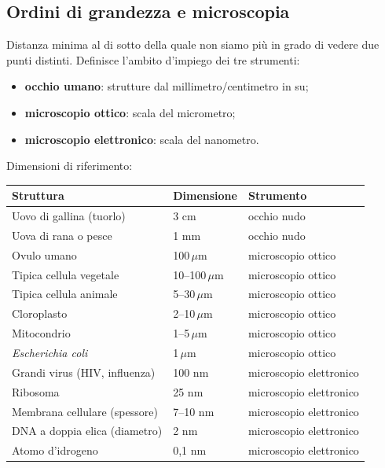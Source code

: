 \subsection{Ordini di grandezza e microscopia}

Distanza minima al di sotto della quale non siamo più in grado di vedere due punti distinti. Definisce l'ambito d'impiego dei tre strumenti:
\begin{itemize}
  \item \textbf{occhio umano}: strutture dal millimetro/centimetro in su;
  \item \textbf{microscopio ottico}: scala del micrometro;
  \item \textbf{microscopio elettronico}: scala del nanometro.
\end{itemize}

Dimensioni di riferimento:
\begin{table}[htbp]
  \centering \small \renewcommand{\arraystretch}{1.3}
  \begin{tabularx}{\textwidth}{|X|l|l|}
    \hline
    \textbf{Struttura} & \textbf{Dimensione} & \textbf{Strumento} \\
    \hline
    Uovo di gallina (tuorlo) & 3 cm & occhio nudo \\
    \hline
    Uova di rana o pesce & 1 mm & occhio nudo \\
    \hline
    Ovulo umano & 100\,$\mu$m & microscopio ottico \\
    \hline
    Tipica cellula vegetale & 10--100\,$\mu$m & microscopio ottico \\
    \hline
    Tipica cellula animale & 5--30\,$\mu$m & microscopio ottico \\
    \hline
    Cloroplasto & 2--10\,$\mu$m & microscopio ottico \\
    \hline
    Mitocondrio & 1--5\,$\mu$m & microscopio ottico \\
    \hline
    \textit{Escherichia coli} & 1\,$\mu$m & microscopio ottico \\
    \hline
    Grandi virus (HIV, influenza) & 100 nm & microscopio elettronico \\
    \hline
    Ribosoma & 25 nm & microscopio elettronico \\
    \hline
    Membrana cellulare (spessore) & 7--10 nm & microscopio elettronico \\
    \hline
    DNA a doppia elica (diametro) & 2 nm & microscopio elettronico \\
    \hline
    Atomo d'idrogeno & 0,1 nm & microscopio elettronico \\
    \hline
  \end{tabularx}
\end{table}

